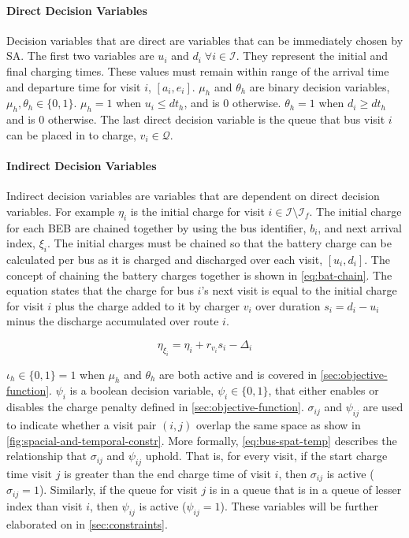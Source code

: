 \documentclass[11pt,a4paper,final]{article}
\newcommand{\Iset}{\mathcal{I}}             %
\newcommand{\Isetfinal}{\mathcal{I}_f}      %
\newcommand{\Qset}{\mathcal{Q}}             %
\begin{document}
\paragraph{Direct Decision Variables}
\label{sec:direct-decision-variables}
Decision variables that are direct are variables that can be immediately chosen by SA. The first two variables are \(u_i\)
and \(d_i \; \forall i \in \Iset\). They represent the initial and final charging times. These values must remain within range of
the arrival time and departure time for visit \(i\), \([a_i, e_i]\). \(\mu_h\) and \(\theta_h\) are binary decision variables, \(\mu_h,
\theta_h \in \{0, 1\}\). \(\mu_h = 1\) when \(u_i \le dt_h\), and is 0 otherwise. \(\theta_h = 1\) when \(d_i \ge dt_h\) and is 0 otherwise. The
last direct decision variable is the queue that bus visit \(i\) can be placed in to charge, \(v_i \in \Qset\).

\paragraph{Indirect Decision Variables}
\label{sec:indirect-decision-variables}
Indirect decision variables are variables that are dependent on direct decision variables. For example \(\eta_i\) is the
initial charge for visit \(i \in \Iset \setminus \Isetfinal\). The initial charge for each BEB are chained together by using the bus
identifier, \(b_i\), and next arrival index, \(\xi_i\). The initial charges must be chained so that the battery charge can be
calculated per bus as it is charged and discharged over each visit, \([u_i, d_i]\). The concept of chaining the battery
charges together is shown in \ref{eq:bat-chain}. The equation states that the charge for bus \(i\)'s next visit is equal to the
initial charge for visit \(i\) plus the charge added to it by charger \(v_i\) over duration \(s_i = d_i - u_i\) minus the
discharge accumulated over route \(i\).

\begin{equation}
\label{eq:bat-chain}
  \eta_{\xi_i} = \eta_i + r_{v_i}s_i - \Delta_i
\end{equation}

\(\iota_h \in \{0,1\} = 1\) when \(\mu_h\) and \(\theta_h\) are both active and is covered in \ref{sec:objective-function}. \(\psi_i\) is a boolean
decision variable, \(\psi_i \in \{0,1\}\), that either enables or disables the charge penalty defined in
\ref{sec:objective-function}. \(\sigma_{ij}\) and \(\psi_{ij}\) are used to indicate whether a visit pair \((i, j)\) overlap the same space
as show in \ref{fig:spacial-and-temporal-constr}. More formally, \ref{eq:bus-spat-temp} describes the relationship that \(\sigma_{ij}\) and
\(\psi_{ij}\) uphold. That is, for every visit, if the start charge time visit \(j\) is greater than the end charge time of
visit \(i\), then \(\sigma_{ij}\) is active (\(\sigma_{ij} = 1\)). Similarly, if the queue for visit \(j\) is in a queue that is in a
queue of lesser index than visit \(i\), then \(\psi_{ij}\) is active (\(\psi_{ij} = 1\)). These variables will be further elaborated
on in \ref{sec:constraints}.
\end{document}
